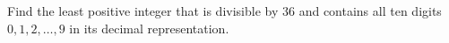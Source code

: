 Find the least positive integer that is divisible by $36$ and contains all ten digits $0,1,2,\dots,9$ in its decimal representation.
